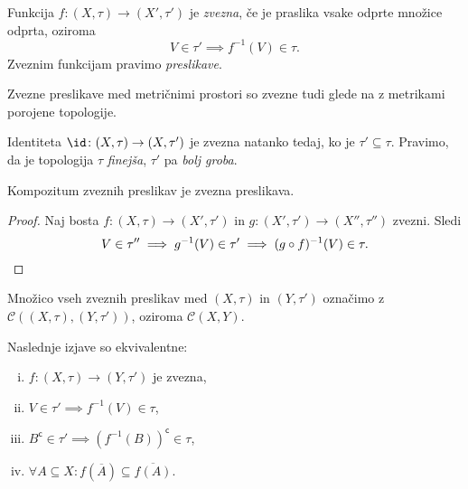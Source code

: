 
\begin{okvir}
\begin{definicija}
Funkcija $f \colon (X,\tau)\to(X',\tau')$ je
\emph{zvezna}, če je praslika vsake odprte
množice odprta, oziroma
\[
V\in\tau' \implies f^{-1}(V) \in \tau.
\]
Zveznim funkcijam pravimo \emph{preslikave}.
\end{definicija}
\end{okvir}

\begin{opomba}
Zvezne preslikave med metričnimi prostori so zvezne tudi glede na z
metrikami porojene topologije.
\end{opomba}

\begin{opomba}
Identiteta $\id \colon (X,\tau) \to (X,\tau')$ je
zvezna natanko tedaj, ko je $\tau' \subseteq \tau$.
Pravimo, da je topologija $\tau$
\emph{finejša},
$\tau'$ pa
\emph{bolj groba}.
\end{opomba}

\begin{trditev}
Kompozitum zveznih preslikav je zvezna preslikava.
\end{trditev}

\begin{proof}
Naj bosta $f \colon (X,\tau) \to (X',\tau')$ in
$g \colon (X',\tau') \to (X'',\tau'')$ zvezni. Sledi
\[
V \in \tau'' \implies g^{-1}(V) \in \tau' \implies
(g \circ f)^{-1}(V) \in \tau. \qedhere
\]
\end{proof}

\begin{opomba}
Množico vseh zveznih preslikav med $(X,\tau)$ in
$(Y,\tau')$ označimo z $\mathcal{C}((X,\tau),
(Y,\tau'))$, oziroma $\mathcal{C}(X,Y)$.
\end{opomba}

\begin{izrek}\label{iz:1}
Naslednje izjave so ekvivalentne:

\begin{enumerate}[i)]
\item $f \colon (X,\tau) \to (Y,\tau')$ je zvezna,
\item $V \in \tau' \implies f^{-1}(V) \in \tau$,
\item $B^\mathsf{c} \in \tau' \implies
(f^{-1}(B))^\mathsf{c} \in \tau$,
\item $\forall A \subseteq X \colon f(\overline{A}) \subseteq
\overline{f(A)}$.
\end{enumerate}
\end{izrek}

